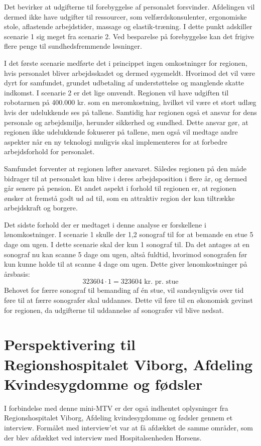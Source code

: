 Det bevirker at udgifterne til forebyggelse af personalet forsvinder. Afdelingen vil dermed ikke have udgifter til ressourcer, som velfærdskonsulenter, ergonomiske stole, aflastende arbejdstider, massage og elastik-træning. I dette punkt adskiller scenarie 1 sig meget fra scenarie 2. Ved besparelse på forebyggelse kan det frigive flere penge til sundhedsfremmende løsninger.

I det første scenarie medførte det i princippet ingen omkostninger for regionen, hvis personalet bliver arbejdsskadet og dermed sygemeldt. Hvorimod det vil være dyrt for samfundet, grundet udbetaling af understøttelse og manglende skatte indkomst. I scenarie 2 er det lige omvendt. Regionen vil have udgiften til robotarmen på 400.000 kr. som en meromkostning, hvilket vil være et stort udlæg hvis der udelukkende ses på tallene. Samtidig har regionen også et ansvar for dens personale og arbejdsmiljø, herunder sikkerhed og sundhed. Dette ansvar gør, at regionen ikke udelukkende fokuserer på tallene, men også vil medtage andre aspekter når en ny teknologi muligvis skal implementeres for at forbedre arbejdsforhold for personalet. 

Samfundet forventer at regionen løfter ansvaret. Således regionen på den måde bidrager til at personalet kan blive i deres arbejdsposition i flere år, og dermed går senere på pension. Et andet aspekt i forhold til regionen er, at regionen ønsker at fremstå godt ud ad til, som en attraktiv region der kan tiltrække arbejdskraft og borgere. 

Det sidste forhold der er medtaget i denne analyse er forskellene i lønomkostninger. I scenarie 1 skulle der 1,2 sonograf til for at bemande en stue 5 dage om ugen. I dette scenarie skal der kun 1 sonograf til. Da det antages at en sonograf nu kan scanne 5 dage om ugen, altså fuldtid, hvorimod sonografen før kun kunne holde til at scanne 4 dage om ugen. Dette giver lønomkostninger på årsbasis:
\begin{equation}
323604\cdot1 = 323604 \text{ kr. pr. stue}
\end{equation}
Behovet for færre sonograf til bemanding af én stue, vil sandsynligvis over tid føre til at færre sonografer skal uddannes. Dette vil føre til en økonomisk gevinst for regionen, da udgifterne til uddannelse af sonografer vil blive nedsat. 

\section{Perspektivering til Regionshospitalet Viborg, Afdeling Kvindesygdomme og fødsler}
I forbindelse med denne mini-MTV er der også indhentet oplysninger fra Regionshospitalet Viborg, Afdeling kvindesygdomme og fødsler gennem et interview. Formålet med interview’et var at få afdækket de samme områder, som der blev afdækket ved interview med Hospitalsenheden Horsens. 

